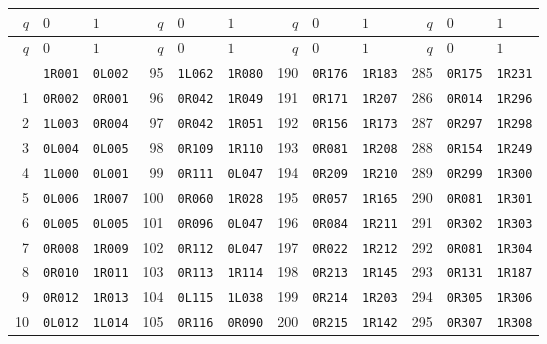 \documentclass[11pt,letterpaper]{article}
\begin{document}
\begingroup
\small
\setlength{\tabcolsep}{5pt}
\begin{longtable}{@{}rll@{\qquad}rll@{\qquad}rll@{\qquad}rll@{}}
\toprule
$q$ & $0$ & $1$ & $q$ & $0$ & $1$ & $q$ & $0$ & $1$ & $q$ & $0$ & $1$\\
\midrule
\endfirsthead
\toprule
$q$ & $0$ & $1$ & $q$ & $0$ & $1$ & $q$ & $0$ & $1$ & $q$ & $0$ & $1$\\
\midrule
\endhead
\bottomrule
\endfoot
0 & \texttt{1R001} & \texttt{0L002} & 95 & \texttt{1L062} & \texttt{1R080} & 190 & \texttt{0R176} & \texttt{1R183} & 285 & \texttt{0R175} & \texttt{1R231} \\
1 & \texttt{0R002} & \texttt{0R001} & 96 & \texttt{0R042} & \texttt{1R049} & 191 & \texttt{0R171} & \texttt{1R207} & 286 & \texttt{0R014} & \texttt{1R296} \\
2 & \texttt{1L003} & \texttt{0R004} & 97 & \texttt{0R042} & \texttt{1R051} & 192 & \texttt{0R156} & \texttt{1R173} & 287 & \texttt{0R297} & \texttt{1R298} \\
3 & \texttt{0L004} & \texttt{0L005} & 98 & \texttt{0R109} & \texttt{1R110} & 193 & \texttt{0R081} & \texttt{1R208} & 288 & \texttt{0R154} & \texttt{1R249} \\
4 & \texttt{1L000} & \texttt{0L001} & 99 & \texttt{0R111} & \texttt{0L047} & 194 & \texttt{0R209} & \texttt{1R210} & 289 & \texttt{0R299} & \texttt{1R300} \\
5 & \texttt{0L006} & \texttt{1R007} & 100 & \texttt{0R060} & \texttt{1R028} & 195 & \texttt{0R057} & \texttt{1R165} & 290 & \texttt{0R081} & \texttt{1R301} \\
6 & \texttt{0L005} & \texttt{0L005} & 101 & \texttt{0R096} & \texttt{0L047} & 196 & \texttt{0R084} & \texttt{1R211} & 291 & \texttt{0R302} & \texttt{1R303} \\
7 & \texttt{0R008} & \texttt{1R009} & 102 & \texttt{0R112} & \texttt{0L047} & 197 & \texttt{0R022} & \texttt{1R212} & 292 & \texttt{0R081} & \texttt{1R304} \\
8 & \texttt{0R010} & \texttt{1R011} & 103 & \texttt{0R113} & \texttt{1R114} & 198 & \texttt{0R213} & \texttt{1R145} & 293 & \texttt{0R131} & \texttt{1R187} \\
9 & \texttt{0R012} & \texttt{1R013} & 104 & \texttt{0L115} & \texttt{1L038} & 199 & \texttt{0R214} & \texttt{1R203} & 294 & \texttt{0R305} & \texttt{1R306} \\
10 & \texttt{0L012} & \texttt{1L014} & 105 & \texttt{0R116} & \texttt{0R090} & 200 & \texttt{0R215} & \texttt{1R142} & 295 & \texttt{0R307} & \texttt{1R308} \\

\end{longtable}
\end{document}
